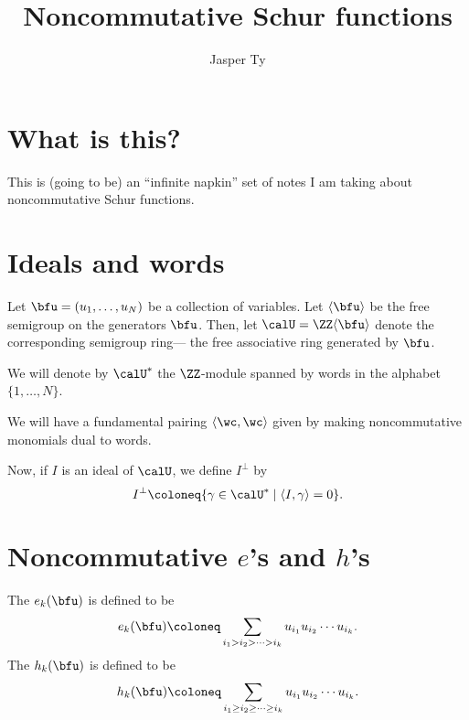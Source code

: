 \documentclass{article}
\title{Noncommutative Schur functions}
\author{Jasper Ty}
\date{}
\newcommand{\ip}[1]{
    \left\langle
        {#1}
    \right\rangle
}
\begin{document}
\maketitle

\section*{What is this?}

This is (going to be) an ``infinite napkin'' set of notes I am taking about noncommutative Schur functions.

\tableofcontents

\newpage

\section{Ideals and words}

Let $\bfu = (u_1,\ldots,u_N)$ be a collection of variables.
Let $\langle \bfu \rangle$ be the free semigroup on the generators $\bfu$.
Then, let $\calU = \ZZ\langle\bfu\rangle$ denote the corresponding semigroup ring--- the free associative ring generated by $\bfu$.

We will denote by $\calU^\ast$ the $\ZZ$-module spanned by words in the alphabet $\{1,\ldots,N\}$.

We will have a fundamental pairing $\ip{\wc,\wc}$ given by making noncommutative monomials dual to words.

Now, if $I$ is an ideal of $\calU$, we define $I^\perp$ by
\[
    I^\perp
    \coloneq
    \{
        \gamma \in \calU^\ast
        \mid
        \ip{I, \gamma} = 0
    \}.
\]

\section{
    Noncommutative 
    \texorpdfstring{$e$}{e}'s
    and
    \texorpdfstring{$h$}{h}'s
}

\begin{definition}
    The  $e_k(\bfu)$ is defined to be
    \[
        e_k(\bfu)
        \coloneq
        \sum_{i_1 > i_2 > \cdots > i_k}
        u_{i_1} u_{i_2} \cdots u_{i_k}. 
    \]
    The  $h_k(\bfu)$ is defined to be
    \[
        h_k(\bfu)
        \coloneq
        \sum_{i_1 \geq i_2 \geq \cdots \geq i_k}
        u_{i_1} u_{i_2} \cdots u_{i_k}. 
    \]
\end{definition}
\end{document}
